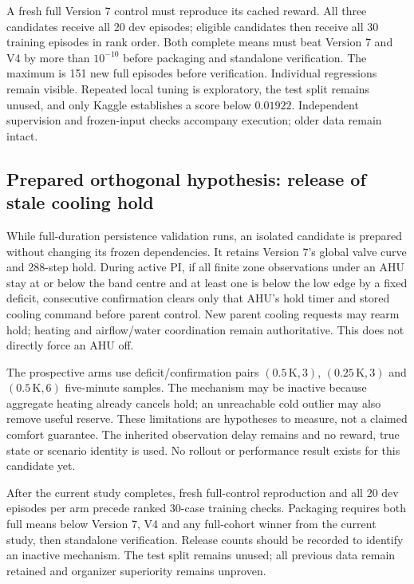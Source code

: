 A fresh full Version 7 control must reproduce its cached reward. All three
candidates receive all 20 dev episodes; eligible candidates then receive all
30 training episodes in rank order. Both complete means must beat Version 7
and V4 by more than $10^{-10}$ before packaging and standalone verification.
The maximum is 151 new full episodes before verification. Individual regressions
remain visible. Repeated local tuning is exploratory, the test split remains
unused, and only Kaggle establishes a score below $0.01922$. Independent
supervision and frozen-input checks accompany execution; older data remain intact.



\subsection{Prepared orthogonal hypothesis: release of stale cooling hold}
While full-duration persistence validation runs, an isolated candidate is
prepared without changing its frozen dependencies. It retains Version 7's
global valve curve and 288-step hold. During active PI, if all finite zone
observations under an AHU stay at or below the band centre and at least one
is below the low edge by a fixed deficit, consecutive confirmation clears
only that AHU's hold timer and stored cooling command before parent control.
New parent cooling requests may rearm hold; heating and airflow/water
coordination remain authoritative. This does not directly force an AHU off.

The prospective arms use deficit/confirmation pairs $(0.5\,\mathrm{K},3)$,
$(0.25\,\mathrm{K},3)$ and $(0.5\,\mathrm{K},6)$ five-minute samples.
The mechanism may be inactive because aggregate heating already cancels hold;
an unreachable cold outlier may also remove useful reserve. These limitations
are hypotheses to measure, not a claimed comfort guarantee. The inherited
observation delay remains and no reward, true state or scenario identity is used.
No rollout or performance result exists for this candidate yet.

After the current study completes, fresh full-control reproduction and all
20 dev episodes per arm precede ranked 30-case training checks. Packaging
requires both full means below Version 7, V4 and any full-cohort winner from
the current study, then standalone verification. Release counts should be
recorded to identify an inactive mechanism. The test split remains unused;
all previous data remain retained and organizer superiority remains unproven.

